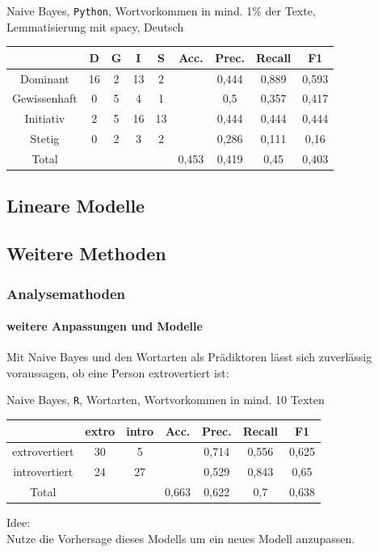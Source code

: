 \documentclass{beamer}
\begin{document}
\begin{frame}
\begin{center}
Naive Bayes, \texttt{Python}, Wortvorkommen in mind. 1\% der Texte,\\
Lemmatisierung mit spacy, Deutsch\
\begin{tabular}{|c|c|c|c|c|c|c|c|c|}
\hline
 & D 	& G	& I & S	& Acc.	& Prec. & Recall	& F1\\
\hline
Dominant & 16 & 2 & 13 & 2 & & 0,444 & 0,889 & 0,593\\
Gewissenhaft & 0 & 5 & 4 & 1 & & 0,5 & 0,357 & 0,417\\
Initiativ & 2 & 5 & 16 & 13& & 0,444 & 0,444 & 0,444\\
Stetig & 0 & 2 & 3 & 2& & 0,286 & 0,111 & 0,16 \\
\hline
Total  &   &   &   &   & 0,453 & 0,419  & 0,45   & 0,403\\
\hline
\end{tabular}
\end{center}
\end{frame}

\subsection{Lineare Modelle}

\subsection{Weitere Methoden}
\begin{frame}
 \frametitle{Analysemathoden}
 \framesubtitle{weitere Anpassungen und Modelle}
 Mit Naive Bayes und den Wortarten als Prädiktoren lässt sich zuverlässig voraussagen,
 ob eine Person extrovertiert ist:\\
 \vspace{12pt}
 \begin{center} 
 Naive Bayes, \texttt{R}, Wortarten, Wortvorkommen in mind. 10 Texten
  \begin{tabular}{c|c|c|c|c|c|c|}
                & extro & intro & Acc.  & Prec. & Recall    & F1 \\
  \hline
  extrovertiert & 30    & 5     &       & 0,714 & 0,556     & 0,625 \\
  introvertiert & 24    & 27    &       & 0,529 & 0,843     & 0,65 \\
  \hline
  Total         &       &       & 0,663 & 0,622 & 0,7       & 0,638 \\
  \hline
 \end{tabular}
 
 \end{center}

 \vspace{12pt}
 
 Idee:\\
 Nutze die Vorhersage dieses Modells um ein neues Modell anzupassen.
\end{frame}
\end{document}
